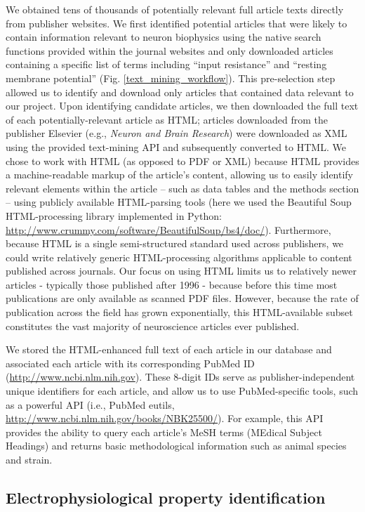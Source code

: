 \documentclass{template/frontiersSCNS} %
\begin{document}
We obtained tens of thousands of potentially relevant full article texts directly from publisher websites.  
We first identified potential articles that were likely to contain information relevant to neuron biophysics using the native search functions provided within the journal websites and only downloaded articles containing a specific list of terms including ``input resistance'' and ``resting membrane potential'' (Fig. \ref{text_mining_workflow}).  
This pre-selection step allowed us to identify and download only articles that contained data relevant to our project.  
Upon identifying candidate articles, we then downloaded the full text of each potentially-relevant article as HTML; 
articles downloaded from the publisher Elsevier (e.g., \emph{Neuron and Brain Research}) were downloaded as XML using the provided text-mining API and subsequently converted to HTML.  
We chose to work with HTML (as opposed to PDF or XML) because HTML provides a machine-readable markup of the article's content, allowing us to easily identify relevant elements within the article -- such as data tables and the methods section -- using publicly available HTML-parsing tools (here we used the Beautiful Soup HTML-processing library implemented in Python: \url{http://www.crummy.com/software/BeautifulSoup/bs4/doc/}).  
Furthermore, because HTML is a single semi-structured standard used across publishers, we could write relatively generic HTML-processing algorithms applicable to content published across journals.  
Our focus on using HTML limits us to relatively newer articles - typically those published after 1996 - because before this time most publications are only available as scanned PDF files.  
However, because the rate of publication across the field has grown exponentially, this HTML-available subset constitutes the vast majority of neuroscience articles ever published.  

We stored the HTML-enhanced full text of each article in our database and associated each article with its corresponding PubMed ID (\url{http://www.ncbi.nlm.nih.gov}).  
These 8-digit IDs serve as publisher-independent unique identifiers for each article, and allow us to use PubMed-specific tools, such as a powerful API (i.e., PubMed eutils, \url{http://www.ncbi.nlm.nih.gov/books/NBK25500/}).  
For example, this API provides the ability to query each article's MeSH terms (MEdical Subject Headings) and returns basic methodological information such as animal species and strain.

\subsection{Electrophysiological property identification}
\end{document}
